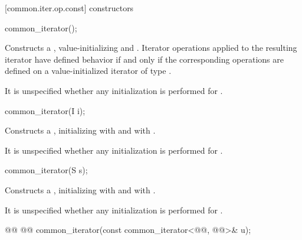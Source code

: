\begin{addedblock}
[common.iter.op.const]{ constructors}

%
\begin{itemdecl}
common_iterator();
\end{itemdecl}

\begin{itemdescr}
\pnum
\effects Constructs a , value-initializing 
and . Iterator operations applied to the resulting iterator have defined
behavior if and only if the corresponding operations are defined on a
value-initialized iterator of type .

\newtxt{
\pnum
\remarks} It is unspecified whether any initialization is performed for
.
\end{itemdescr}

%
\begin{itemdecl}
common_iterator(I i);
\end{itemdecl}

\begin{itemdescr}
\pnum
\effects Constructs a , initializing
 with  and  with .
\end{itemdescr}

\newtxt{
\pnum
\remarks} It is unspecified whether any initialization is performed for
.

%
\begin{itemdecl}
common_iterator(S s);
\end{itemdecl}

\begin{itemdescr}
\pnum
\effects Constructs a , initializing
 with  and  with .
\end{itemdescr}

\newtxt{
\pnum
\remarks} It is unspecified whether any initialization is performed for
.

%
\begin{itemdecl}
@@
  @@
common_iterator(const common_iterator<@@, @@>& u);
\end{itemdecl}


\end{addedblock}
